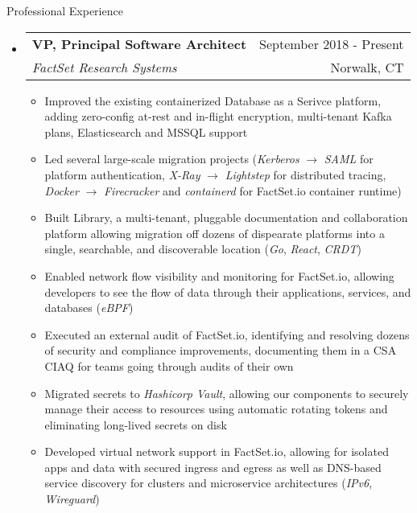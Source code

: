 \documentclass[letterpaper,10pt]{article}
\makeatletter
\newenvironment{ressection}[1]{
	\vspace{4pt}
	{\fontfamily{phv}\selectfont\Large#1}
	\begin{itemize}
	\vspace{3pt}
}{
	\end{itemize}
}
\newcommand{\ressubitem}[1]{
	\vspace{-1pt}
	\item \begin{flushleft} #1 \end{flushleft}
}
\newcommand{\resbigitem}[4]{
	\vspace{-5pt}
	\item
	\begin{tabular*}{6in}{l@{\extracolsep{\fill}}r}
		\textbf{#1} & #2 \\
		\textit{#3} & #4\\
	\end{tabular*}
}
\newenvironment{ressubsec}[4]{
	\resbigitem{#1}{#2}{#3}{#4}
	\vspace{-2pt}
	\begin{itemize}
}{
	\end{itemize}
}
\makeatother
\begin{document}
\begin{ressection}{Professional Experience}
\begin{ressubsec}{VP, Principal Software Architect}{September 2018 - Present}{FactSet Research Systems}{Norwalk, CT}
		\ressubitem{Improved the existing containerized Database as a Serivce platform, adding zero-config at-rest and in-flight encryption, multi-tenant Kafka plans, Elasticsearch and MSSQL support}
		\ressubitem{Led several large-scale migration projects (\textit{Kerberos} $\rightarrow$ \textit{SAML} for platform authentication, \textit{X-Ray} $\rightarrow$ \textit{Lightstep} for distributed tracing, \textit{Docker} $\rightarrow$ \textit{Firecracker} and \textit{containerd} for FactSet.io container runtime)}
		\ressubitem{Built Library, a multi-tenant, pluggable documentation and collaboration platform allowing migration off dozens of dispearate platforms into a single, searchable, and discoverable location (\textit{Go}, \textit{React}, \textit{CRDT})}
		\ressubitem{Enabled network flow visibility and monitoring for FactSet.io, allowing developers to see the flow of data through their applications, services, and databases (\textit{eBPF})}
		\ressubitem{Executed an external audit of FactSet.io, identifying and resolving dozens of security and compliance improvements, documenting them in a CSA CIAQ for teams going through audits of their own}
		\ressubitem{Migrated secrets to \textit{Hashicorp Vault}, allowing our components to securely manage their access to resources using automatic rotating tokens and eliminating long-lived secrets on disk}
		\ressubitem{Developed virtual network support in FactSet.io, allowing for isolated apps and data with secured ingress and egress as well as DNS-based service discovery for clusters and microservice architectures (\textit{IPv6}, \textit{Wireguard})}
	\end{ressubsec}

\pagebreak


\end{ressection}
\end{document}
